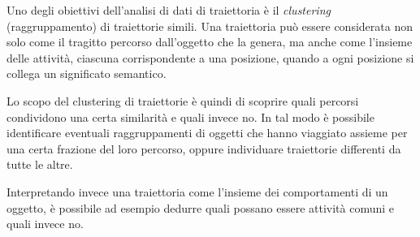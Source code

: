 Uno degli obiettivi dell'analisi di dati di traiettoria è il \textit{clustering} (raggruppamento) di traiettorie simili.
Una traiettoria può essere considerata non solo come il tragitto percorso dall'oggetto che la genera,
ma anche come l'insieme delle attività, ciascuna corrispondente a una posizione, quando a ogni posizione si collega un significato semantico.

Lo scopo del clustering di traiettorie è quindi di scoprire quali percorsi condividono una certa similarità e quali invece no.
In tal modo è possibile identificare eventuali raggruppamenti di oggetti che hanno viaggiato assieme per una certa frazione del loro percorso, oppure individuare
traiettorie differenti da tutte le altre.

Interpretando invece una traiettoria come l'insieme dei comportamenti di un oggetto,
è possibile ad esempio dedurre quali possano essere attività comuni e quali invece no.
